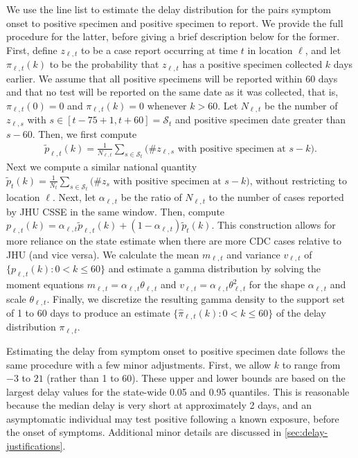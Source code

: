 \documentclass{article}
\begin{document}
We use the line list to estimate the delay distribution for the pairs symptom
onset to positive specimen and positive specimen to report. We provide the full
procedure for the latter, before giving a brief description below for the
former. First, define $z_{\ell,t}$ to be a case report occurring at time $t$ in
location $\ell$, and let $\pi_{\ell,t}(k)$ to be the probability that
$z_{\ell,t}$ has a positive specimen collected $k$ days earlier. We assume that
all positive specimens will be reported within 60 days and that no test will be
reported on the same date as it was collected, that is, $\pi_{\ell,t}(0) = 0$
and $\pi_{\ell,t}(k) = 0$ whenever $k > 60$. Let $N_{\ell,t}$ be the number of
$z_{\ell,s}$ with $s\in[t-75+1,t+60] = \mathcal{S}_t$ and positive specimen date
greater than $s-60$. Then, we first compute
\begin{align}
    \tilde{p}_{\ell,t}(k) = \frac{1}{N_{\ell,t}}\sum_{s \in \mathcal{S}_t}
    \big(\textrm{\# $z_{\ell,s}$ with positive specimen at $s-k$}\big).
\end{align}
Next we compute a similar national quantity $\tilde{p}_{t}(k) =
\frac{1}{N_{t}}\sum_{s \in \mathcal{S}_t} \big(\textrm{\# $z_{s}$ with positive
specimen at $s-k$}\big)$, without restricting to location $\ell$. Next, let
$\alpha_{\ell,t}$ be the ratio of $N_{\ell,t}$ to the number of cases reported
by JHU CSSE\cite{dong2020interactive} in the same window. Then, compute
$p_{\ell,t}(k) = \alpha_{\ell,t}\tilde{p}_{\ell,t}(k) +
(1-\alpha_{\ell,t})\tilde{p}_t(k)$. This construction allows for more reliance
on the state estimate when there are more CDC cases relative to JHU (and vice
versa). We calculate the mean $m_{\ell,t}$ and variance $v_{\ell,t}$ of
$\{p_{\ell,t}(k) : 0<k\leq 60\}$ and estimate a gamma distribution by solving
the moment equations $m_{\ell,t} = \alpha_{\ell,t}\theta_{\ell,t}$ and
$v_{\ell,t}= \alpha_{\ell,t}\theta_{\ell,t}^2$ for the shape $\alpha_{\ell,t}$
and scale $\theta_{\ell,t}$. Finally, we discretize the resulting gamma density
to the support set of 1 to 60 days to produce an estimate
$\{\widehat{\pi}_{\ell,t}(k): 0 < k \leq 60\}$ of the delay distribution
$\pi_{\ell,t}$.
 
Estimating the delay from symptom onset to positive specimen date follows the
same procedure with a few minor adjustments. First, we allow $k$ to range from
$-3$ to $21$ (rather than 1 to 60). These upper and lower bounds are based on
the largest delay values for the state-wide 0.05 and 0.95 quantiles. This is
reasonable because the median delay is very short at approximately 2 days, and
an asymptomatic individual may test positive following a known exposure, before
the onset of symptoms. Additional minor details are discussed in
\autoref{sec:delay-justifications}.
\end{document}
